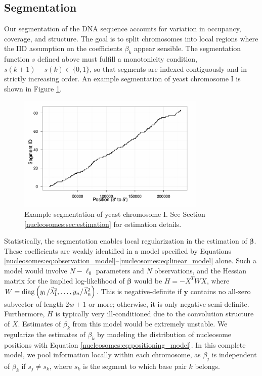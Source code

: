 
\subsection{Segmentation}
\label{nucleosomes:sec:segmentation}

Our segmentation of the DNA sequence accounts for variation in occupancy, coverage, and structure.
%
The goal is to split chromosomes into local regions where the IID assumption on the coefficients $\beta_k$ appear sensible.
The segmentation function $s$ defined above must fulfill a monotonicity condition, $s(k+1)-s(k) \in \{0,1\}$, so that segments are indexed contiguously and in strictly increasing order.
An example segmentation of yeast chromosome I is shown in Figure \ref{nucleosomes:fig:segmentation}.
%
\ifx\nofigures\undefined
\begin{figure}[t!]
\centering
 \includegraphics[width=0.8\textwidth]{figures/nucleosomes/plotRegions_H_1-combined_chrom01-small}
 \caption{Example segmentation of yeast chromosome I. See Section \ref{nucleosomes:sec:estimation} for estimation details.\label{nucleosomes:fig:segmentation}} 
\end{figure}
\fi

Statistically, the segmentation enables local regularization in the estimation of $\bm \beta$.
% 
These coefficients are weakly identified in a model specified by Equations \ref{nucleosomes:eq:observation_model}--\ref{nucleosomes:eq:linear_model} alone.
Such a model would involve $N - \ell_0$ parameters and $N$ observations, and the Hessian matrix for the implied log-likelihood of $\bm \beta$ would be $H = - X^T W X$, where $W = \mathrm{diag}\left(y_1 / \vec \lambda_1^2, \ldots, y_n / \vec \lambda_n^2\right)$.
This is negative-definite if $\bm y$ contains no all-zero subvector of length $2w+1$ or more; otherwise, it is only negative semi-definite.
Furthermore, $H$ is typically very ill-conditioned due to the convolution structure of $X$.
Estimates of $\beta_k$ from this model would be extremely unstable.
%
We regularize the estimates of $\beta_k$ by modeling the distribution of nucleosome positions with Equation \ref{nucleosomes:eq:positioning_model}.
In this complete model, we pool information locally within each chromosome, as $\beta_j$ is independent of $\beta_k$ if $s_j \neq s_k$, where $s_k$ is the segment to which base pair $k$ belongs.


